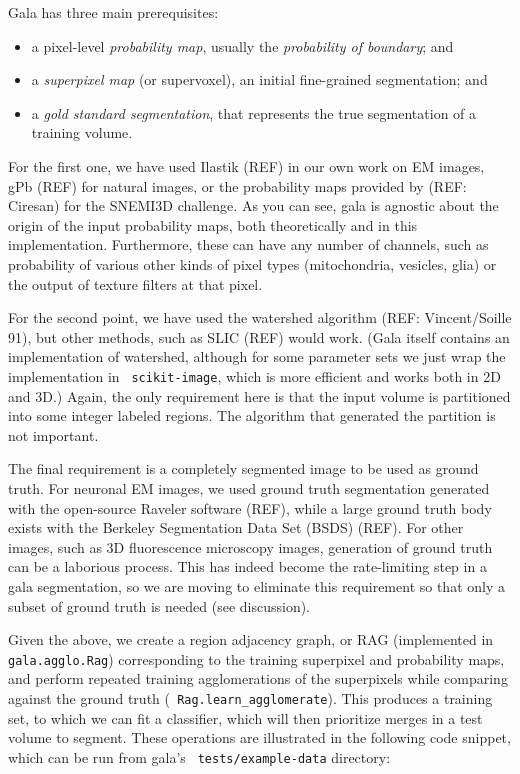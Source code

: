 \documentclass{frontiersSCNS} %
\begin{document}
Gala has three main prerequisites:
\begin{itemize}
\item a pixel-level \emph{probability map}, usually the \emph{probability of boundary}; and
\item a \emph{superpixel map} (or supervoxel), an initial fine-grained segmentation; and
\item a \emph{gold standard segmentation}, that represents the true segmentation of a training volume.
\end{itemize}

For the first one, we have used Ilastik (REF) in our own work on EM images, gPb (REF) for natural images, or the probability maps provided by (REF: Ciresan) for the SNEMI3D challenge.
As you can see, gala is agnostic about the origin of the input probability maps, both theoretically and in this implementation.
Furthermore, these can have any number of channels, such as probability of various other kinds of pixel types (mitochondria, vesicles, glia) or the output of texture filters at that pixel.

For the second point, we have used the watershed algorithm (REF: Vincent/Soille 91), but other methods, such as SLIC (REF) would work.
(Gala itself contains an implementation of watershed, although for some parameter sets we just wrap the implementation in \texttt{ \small scikit-image}, which is more efficient and works both in 2D and 3D.)
Again, the only requirement here is that the input volume is partitioned into some integer labeled regions.
The algorithm that generated the partition is not important.

The final requirement is a completely segmented image to be used as ground truth.
For neuronal EM images, we used ground truth segmentation generated with the open-source Raveler software (REF), while a large ground truth body exists with the Berkeley Segmentation Data Set (BSDS) (REF).
For other images, such as 3D fluorescence microscopy images, generation of ground truth can be a laborious process.
This has indeed become the rate-limiting step in a gala segmentation, so we are moving to eliminate this requirement so that only a subset of ground truth is needed (see discussion).

Given the above, we create a region adjacency graph, or RAG (implemented in \texttt{ \small gala.agglo.Rag}) corresponding to the training superpixel and probability maps, and perform repeated training agglomerations of the superpixels while comparing against the ground truth (\texttt{ \small Rag.learn\_agglomerate}).
This produces a training set, to which we can fit a classifier, which will then prioritize merges in a test volume to segment.
These operations are illustrated in the following code snippet, which can be run from gala's \texttt{ \small tests/example-data} directory:
\end{document}
